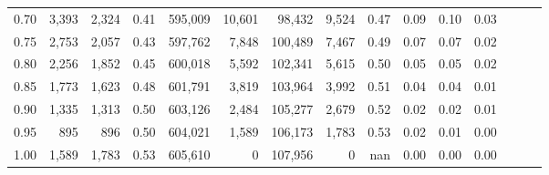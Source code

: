 \begin{tabular}{rrrrrrrrrrrrrrr}
0.70 &    3,393 &   2,324 &  0.41 &  595,009 &   10,601 &   98,432 &    9,524 &  0.47 &  0.09 &  0.10 &      0.03 \\
0.75 &    2,753 &   2,057 &  0.43 &  597,762 &    7,848 &  100,489 &    7,467 &  0.49 &  0.07 &  0.07 &      0.02 \\
0.80 &    2,256 &   1,852 &  0.45 &  600,018 &    5,592 &  102,341 &    5,615 &  0.50 &  0.05 &  0.05 &      0.02 \\
0.85 &    1,773 &   1,623 &  0.48 &  601,791 &    3,819 &  103,964 &    3,992 &  0.51 &  0.04 &  0.04 &      0.01 \\
0.90 &    1,335 &   1,313 &  0.50 &  603,126 &    2,484 &  105,277 &    2,679 &  0.52 &  0.02 &  0.02 &      0.01 \\
0.95 &      895 &     896 &  0.50 &  604,021 &    1,589 &  106,173 &    1,783 &  0.53 &  0.02 &  0.01 &      0.00 \\
1.00 &    1,589 &   1,783 &  0.53 &  605,610 &        0 &  107,956 &        0 &   nan &  0.00 &  0.00 &      0.00 \\
\bottomrule
\end{tabular}
